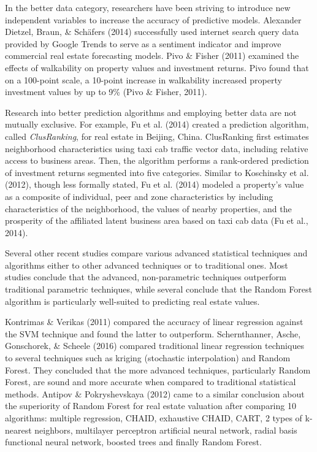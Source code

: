 \documentclass[conference,final,]{IEEEtran}
\begin{document}
In the better data category, researchers have been striving to introduce
new independent variables to increase the accuracy of predictive models.
Alexander Dietzel, Braun, \& Schäfers (2014) successfully used internet
search query data provided by Google Trends to serve as a sentiment
indicator and improve commercial real estate forecasting models. Pivo \&
Fisher (2011) examined the effects of walkability on property values and
investment returns. Pivo found that on a 100-point scale, a 10-point
increase in walkability increased property investment values by up to
9\% (Pivo \& Fisher, 2011).

Research into better prediction algorithms and employing better data are
not mutually exclusive. For example, Fu et al. (2014) created a
prediction algorithm, called \emph{ClusRanking}, for real estate in
Beijing, China. ClusRanking first estimates neighborhood characteristics
using taxi cab traffic vector data, including relative access to
business areas. Then, the algorithm performs a rank-ordered prediction
of investment returns segmented into five categories. Similar to
Koschinsky et al. (2012), though less formally stated, Fu et al. (2014)
modeled a property's value as a composite of individual, peer and zone
characteristics by including characteristics of the neighborhood, the
values of nearby properties, and the prosperity of the affiliated latent
business area based on taxi cab data (Fu et al., 2014).

Several other recent studies compare various advanced statistical
techniques and algorithms either to other advanced techniques or to
traditional ones. Most studies conclude that the advanced,
non-parametric techniques outperform traditional parametric techniques,
while several conclude that the Random Forest algorithm is particularly
well-suited to predicting real estate values.

Kontrimas \& Verikas (2011) compared the accuracy of linear regression
against the SVM technique and found the latter to outperform.
Schernthanner, Asche, Gonschorek, \& Scheele (2016) compared traditional
linear regression techniques to several techniques such as kriging
(stochastic interpolation) and Random Forest. They concluded that the
more advanced techniques, particularly Random Forest, are sound and more
accurate when compared to traditional statistical methods. Antipov \&
Pokryshevskaya (2012) came to a similar conclusion about the superiority
of Random Forest for real estate valuation after comparing 10
algorithms: multiple regression, CHAID, exhaustive CHAID, CART, 2 types
of k-nearest neighbors, multilayer perceptron artificial neural network,
radial basis functional neural network, boosted trees and finally Random
Forest.
\end{document}
